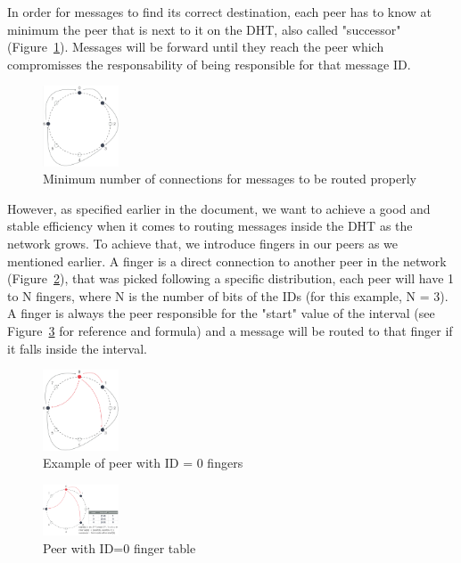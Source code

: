 In order for messages to find its correct destination, each peer has to know at minimum the peer that is next to it on the DHT, also called "successor" (Figure~\ref{fig:c-4}). Messages will be forward until they reach the peer which compromisses the responsability of being responsible for that message ID.

\begin{figure}[h!]
  \centering
  \includegraphics[width=0.2\textwidth]{figs/chord-4}
  \caption{Minimum number of connections for messages to be routed properly}
  \label{fig:c-4}
\end{figure}

However, as specified earlier in the document, we want to achieve a good and stable efficiency when it comes to routing messages inside the DHT as the network grows. To achieve that, we introduce fingers in our peers as we mentioned earlier. A finger is a direct connection to another peer in the network (Figure~\ref{fig:c-5}), that was picked following a specific distribution, each peer will have 1 to N fingers, where N is the number of bits of the IDs (for this example, N = 3). A finger is always the peer responsible for the "start" value of the interval (see Figure~\ref{fig:c-6} for reference and formula) and a message will be routed to that finger if it falls inside the interval.

\begin{figure}[h!]
  \centering
  \includegraphics[width=0.2\textwidth]{figs/chord-5}
  \caption{Example of peer with ID = 0 fingers}
  \label{fig:c-5}
\end{figure}

\begin{figure}[h!]
  \centering
  \includegraphics[width=0.2\textwidth]{figs/chord-6}
  \caption{Peer with ID=0 finger table}
  \label{fig:c-6}
\end{figure}


